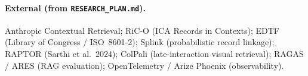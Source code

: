\documentclass[11pt]{article}
\newcommand{\code}[1]{\texttt{#1}}
\begin{document}
\paragraph{External (from \code{RESEARCH\_PLAN.md}).} Anthropic Contextual Retrieval; RiC-O (ICA
Records in Contexts); EDTF (Library of Congress / ISO~8601-2); Splink (probabilistic record linkage);
RAPTOR (Sarthi et al.\ 2024); ColPali (late-interaction visual retrieval); RAGAS / ARES (RAG
evaluation); OpenTelemetry / Arize Phoenix (observability).
\end{document}
